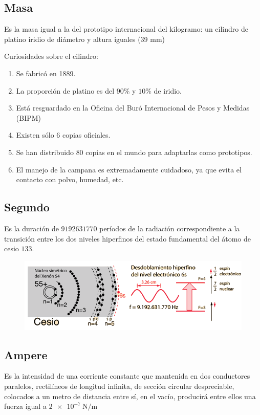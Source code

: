 \subsection{Masa}
Es la masa igual a la del prototipo internacional del kilogramo: un cilindro de platino iridio de diámetro y altura iguales (39 mm)
\par
Curiosidades sobre el cilindro:
\begin{enumerate}[label=\roman*.]
\item Se fabricó en 1889.
\item La proporción de platino es del $90\%$ y $10\%$ de iridio.
\item Está resguardado en la Oficina del Buró Internacional de Pesos y Medidas (BIPM)
\item Existen sólo 6 copias oficiales.
\item Se han distribuido $80$ copias en el mundo para adaptarlas como prototipos.
\item El manejo de la campana es extremadamente cuidadoso, ya que evita el contacto con polvo, humedad, etc.
\end{enumerate}
\subsection{Segundo}
Es la duración de $9 192 631 770$ períodos de la radiación correspondiente a la transición entre los dos niveles hiperfinos del estado fundamental del átomo de cesio $133$.
\begin{figure}[H]
    \centering
    \includegraphics[scale=0.6]{./Imagenes/Csclock.png}
\end{figure}
\subsection{Ampere}
Es la intensidad de una corriente constante que mantenida en dos conductores paralelos, rectilíneos de longitud infinita, de sección circular despreciable, colocados a un metro de distancia entre sí, en el vacío, producirá entre ellos una fuerza igual a $\SI{2e-7}{\newton\per\metre}$
